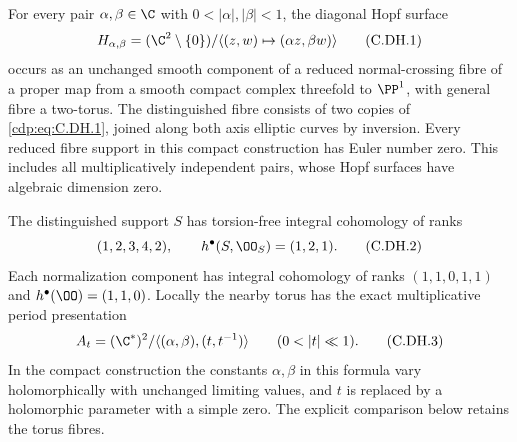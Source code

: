 \begin{proposition}\label{cdp:st:C.2.UN.41}

For every pair $\alpha,\beta\in\C$ with
$0<|\alpha|,|\beta|<1$, the diagonal Hopf surface
\[
 H_{\alpha,\beta}=(\C^2\setminus\{0\})/
       \langle(z,w)\mapsto(\alpha z,\beta w)\rangle
                                                               \tag{C.DH.1}\label{cdp:eq:C.DH.1}
\]
occurs as an unchanged smooth component of a
reduced normal-crossing fibre of a proper map
from a smooth compact complex threefold to
$\PP^1$, with general fibre a two-torus.
The distinguished fibre consists of two copies
of \eqref{cdp:eq:C.DH.1}, joined along both axis elliptic
curves by inversion. Every reduced fibre
support in this compact construction has
Euler number zero. This includes all
multiplicatively independent pairs, whose
Hopf surfaces have algebraic dimension zero.

The distinguished support $S$ has torsion-free
integral cohomology of ranks
\[
                  (1,2,3,4,2),\qquad
                  h^\bullet(S,\OO_S)=(1,2,1).        \tag{C.DH.2}\label{cdp:eq:C.DH.2}
\]
Each normalization component has integral
cohomology of ranks $(1,1,0,1,1)$ and
$h^\bullet(\OO)=(1,1,0)$.
Locally the nearby torus has the exact
multiplicative period presentation
\[
 A_t=(\C^*)^2/
        \langle(\alpha,\beta),(t,t^{-1})\rangle
                    \qquad(0<|t|\ll1).             \tag{C.DH.3}\label{cdp:eq:C.DH.3}
\]
In the compact construction the constants
$\alpha,\beta$ in this formula vary
holomorphically with unchanged limiting
values, and $t$ is replaced by a holomorphic
parameter with a simple zero. The explicit
comparison below retains the torus fibres.
\end{proposition}

